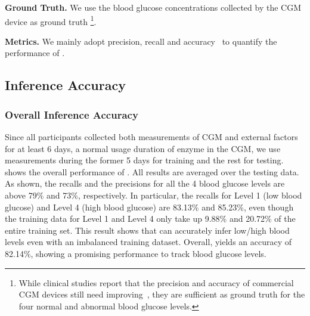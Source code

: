 \textbf{Ground Truth.}
We use the blood glucose concentrations collected by the CGM device as ground truth \footnote{While clinical studies report that the precision and accuracy of commercial CGM devices still need improving~\cite{bib:MEP08:Do, bib:JDST10:Vaddiraju}, they are sufficient as ground truth for the four normal and abnormal blood glucose levels.}.

\textbf{Metrics.}
We mainly adopt precision, recall and accuracy~\cite{prf1} to quantify the performance of \sysname.
%
%


\subsection{Inference Accuracy}
\subsubsection{Overall Inference Accuracy}
Since all participants collected both measurements of CGM and external factors for at least 6 days, \ie a normal usage duration of enzyme in the CGM, we use measurements during the former 5 days for training and the rest for testing.
 shows the overall performance of \sysname.
All results are averaged over the testing data.
As shown, the recalls and the precisions for all the 4 blood glucose levels are above 79\% and 73\%, respectively.
In particular, the recalls for Level 1 (low blood glucose) and Level 4 (high blood glucose) are 83.13\% and 85.23\%, even though the training data for Level 1 and Level 4 only take up 9.88\% and 20.72\% of the entire training set.
This result shows that \sysname can accurately infer low/high blood levels even with an imbalanced training dataset.
Overall, \sysname yields an accuracy of 82.14\%, showing a promising performance to track blood glucose levels.

